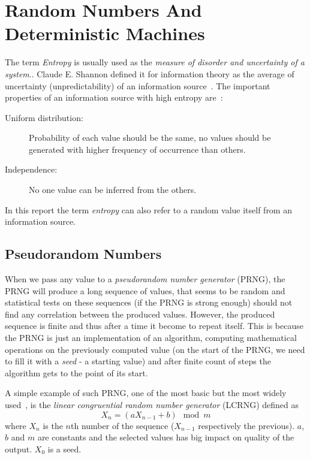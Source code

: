 \chapter{Random Numbers And Deterministic Machines}\label{chap:randomNumbers}

The term {\em Entropy} is usually used  as the {\em measure of disorder and uncertainty of a system}.\cite{Entrophy}. Claude E. Shannon defined it for information theory as the average of uncertainty (unpredictability) of an information source~\cite[p.~396]{AMathematicalTheoryOfCommunication}. The important properties of an information source with high entropy are~\cite[p.~150]{CryptographyAndNetworkSecurity}: 
\begin{description}
 \item [Uniform distribution:] Probability of each value should be the same, no values should be generated with higher frequency of occurrence than others.
 \item [Independence:] No one value can be inferred from the others.
\end{description}


In this report the term {\em entropy} can also refer to a random value itself from an information source. 



\section{Pseudorandom Numbers}
When we pass any value to a {\em pseudorandom number generator} (PRNG), the PRNG will produce a long sequence of values, that seems to be random and statistical tests on these sequences (if the PRNG is strong enough) should not find any correlation between the produced values. However, the produced sequence is finite and thus after a time it become to repeat itself. This is because the PRNG is just an implementation of an algorithm, computing mathematical operations on the previously computed value (on the start of the PRNG, we need to fill it with a {\em seed} - a starting value) and after finite count of steps the algorithm gets to the point of its start.

A simple example of such PRNG, one of the most basic but the most widely used~\cite[p.~151]{CryptographyAndNetworkSecurity}, is the {\em linear congruential random number generator} (LCRNG) defined as 
\begin{equation}\label{eq:LCRNG}
  X_n = (aX_{n-1} + b) \mod{m}
\end{equation}
where $X_n$ is the $n$th number of the sequence ($X_{n-1}$ respectively the previous). $a$, $b$ and $m$ are constants and the selected values has big impact on quality of the output. $X_0$ is a seed. 

